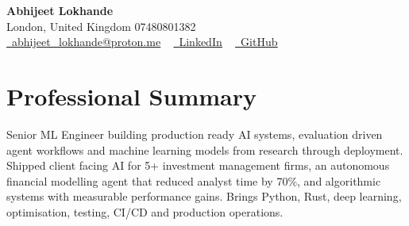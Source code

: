 \documentclass[a4paper,10pt]{article}
\begin{document}
    \begin{center}
        {\Huge\bfseries Abhijeet Lokhande}
        \\[2pt] {\color{muted}London, United Kingdom \textbar{} 07480801382}\\
        \small
        \href{mailto:abhijeet_lokhande@proton.me}{\raisebox{-0.2\height}{\color{primary}\faEnvelope}\  \underline{abhijeet\_lokhande@proton.me}} ~
        \href{https://www.linkedin.com/in/ablds/}{\raisebox{-0.2\height}{\color{primary}\faLinkedin}\ \underline{LinkedIn}}  ~
        \href{https://github.com/abhijeetscode}{\raisebox{-0.2\height}{\color{primary}\faGithub}\ \underline{GitHub}}
    \end{center}

\section{Professional Summary}
\vspace{-5pt}
{\color{muted}Senior ML Engineer building production ready AI systems, evaluation driven agent workflows and machine learning models from research through deployment. Shipped client facing AI for 5+ investment management firms, an autonomous financial modelling agent that reduced analyst time by 70\%, and algorithmic systems with measurable performance gains. Brings Python, Rust, deep learning, optimisation, testing, CI/CD and production operations.}
\vspace{2pt}

\end{document}
